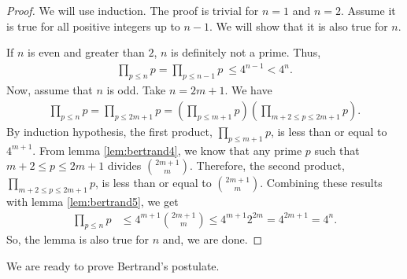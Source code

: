 \documentclass{subfile}
\begin{document}
	\begin{proof}
		We will use induction. The proof is trivial for $n=1$ and $n=2$. Assume it is true for all positive integers up to $n-1$. We will show that it is also true for $n$.

		If $n$ is even and greater than $2$, $n$ is definitely not a prime. Thus,
		\begin{align*}
			\prod_{p\leq n}p =  \prod_{p\leq n-1}p\ \leq  4^{n-1}<  4^n.
		\end{align*}
		Now, assume that $n$ is odd. Take $n=2m+1$. We have
		\begin{align*}
			\prod_{p\leq n}p =	\prod_{p\leq 2m+1} p  = \left(\prod_{p\leq m+1}p \right) \left( \prod_{m+2\leq p\leq2m+1}p\right).
		\end{align*}
		By induction hypothesis, the first product, $\prod\limits_{p\leq m+1}p$, is less than or equal to $4^{m+1}$. From lemma \autoref{lem:bertrand4}, we know that any prime $p$ such that $m+2\leq p\leq2m+1$ divides $\binom{2m+1}{m}$. Therefore, the second product, $\prod\limits_{m+2\leq p\leq2m+1}p$, is less than or equal to $\binom{2m+1}{m}$. Combining these results with lemma \autoref{lem:bertrand5}, we get
		\begin{align*}
			\prod_{p\leq n}p &\leq 4^{m+1}\binom{2m+1}{m}\leq 4^{m+1}2^{2m} =  4^{2m+1} = 4^n.
		\end{align*}
		So, the lemma is also true for $n$ and, we are done.
	\end{proof}

	We are ready to prove Bertrand's postulate.
\end{document}
